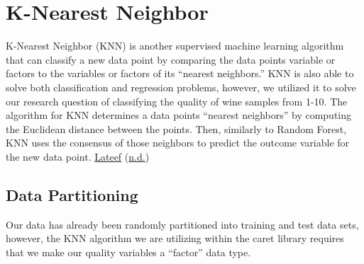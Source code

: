 \documentclass[
]{book}
\newenvironment{Shaded}{\begin{snugshade}}{\end{snugshade}}
\newcommand{\DecValTok}[1]{\textcolor[rgb]{0.00,0.00,0.81}{#1}}
\newcommand{\FunctionTok}[1]{\textcolor[rgb]{0.00,0.00,0.00}{#1}}
\newcommand{\NormalTok}[1]{#1}
\newcommand{\OtherTok}[1]{\textcolor[rgb]{0.56,0.35,0.01}{#1}}
\newcommand{\SpecialCharTok}[1]{\textcolor[rgb]{0.00,0.00,0.00}{#1}}
\newcommand{\StringTok}[1]{\textcolor[rgb]{0.31,0.60,0.02}{#1}}
\begin{document}
\begin{Shaded}
\end{Shaded}

\hypertarget{k-nearest-neighbor}{%
\chapter{K-Nearest Neighbor}\label{k-nearest-neighbor}}

K-Nearest Neighbor (KNN) is another supervised machine learning algorithm that can classify a new data point by comparing the data points variable or factors to the variables or factors of its ``nearest neighbors.'' KNN is also able to solve both classification and regression problems, however, we utilized it to solve our research question of classifying the quality of wine samples from 1-10. The algorithm for KNN determines a data points ``nearest neighbors'' by computing the Euclidean distance between the points. Then, similarly to Random Forest, KNN uses the consensus of those neighbors to predict the outcome variable for the new data point. \protect\hyperlink{ref-knn}{Lateef} (\protect\hyperlink{ref-knn}{n.d.})

\hypertarget{data-partitioning-1}{%
\section{Data Partitioning}\label{data-partitioning-1}}

Our data has already been randomly partitioned into training and test data sets, however, the KNN algorithm we are utilizing within the caret library requires that we make our quality variables a ``factor'' data type.

\begin{Shaded}
\end{Shaded}
\end{document}
